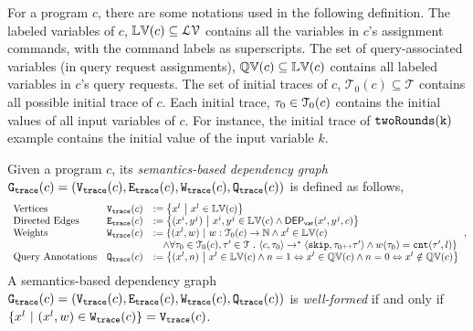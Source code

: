 {
For a program $c$, there are some notations used in the following definition.
The labeled variables of $c$,
$\mathbb{LV}(c) \subseteq \mathcal{LV}$ contains all the variables in $c$'s assignment commands, with the command labels as superscripts. 
The set of query-associated variables (in query request assignments),
$\mathbb{QV}(c) \subseteq \mathbb{LV}(c)$ contains all labeled variables in $c$'s query requests. 
The set of initial traces of $c$,
$\mathcal{T}_0(c) \subseteq \mathcal{T}$
contains all possible initial trace of $c$.
Each initial trace,  $\mathtt{\tau}_0 \in \mathcal{T}_0(c)$ contains the initial values of all input variables of $c$. 
For instance, the initial trace of $\mathtt{twoRounds(k)}$ example contains the initial value of the input variable $k$.
}
\begin{defn}
\label{def:trace_graph}
Given a program ${c}$,
its \emph{semantics-based dependency graph} 
$\mathtt{{G_{trace}}}({c}) = (\mathtt{{V_{trace}}}({c}), \mathtt{{E_{trace}}}({c}), \mathtt{{W_{trace}}}({c}), \mathtt{{Q_{trace}}}({c}))$ is defined as follows,
{\small
\[
\begin{array}{lll}
  \text{Vertices} &
  \traceV({c}) & := \left\{ 
  x^l
  ~ \middle\vert ~ x^l \in \lvar(c)
  \right\}
  \\
  \text{Directed Edges} &
  \traceE({c}) & := 
  \left\{ 
  (x^i, y^j) 
  ~ \middle\vert ~
  x^i, y^j \in \lvar(c) \land \vardep(x^i, y^j, c) 
  \right\}
  \\
  \text{Weights} &
  \traceW({c}) & := 
  \{ 
  (x^l, w) 
  ~ \vert ~ 
  w : \mathcal{T}_0(c) \to \mathbb{N}
  \land
  x^l \in \lvar(c) 
  \\ & &
  \quad \land
  \forall \trace_0 \in \mathcal{T}_0(c), \trace' \in \mathcal{T} \st \config{{c}, \trace_0} \to^{*} 
  \config{\eskip, \trace_0\tracecat\trace'} 
  \land w(\trace_0) = \vcounter(\trace', l) \}  
  \\
  \text{Query Annotations} &
  \traceF({c}) & := 
\left\{(x^l, n)  
~ \middle\vert ~
 x^l \in \lvar(c) \land
n = 1 \Leftrightarrow x^l \in \qvar(c) \land n = 0 \Leftrightarrow  x^l \notin \qvar(c)
\right\}
\end{array},
\]
}
A semantics-based dependency graph $\mathtt{{G_{trace}}}({c})= (\mathtt{{V_{trace}}}({c}), \mathtt{{E_{trace}}}({c}), \mathtt{{W_{trace}}}({c}), \mathtt{{Q_{trace}}}({c}))$ 
is \emph{well-formed} if and only if $ \{x^l \ |\ (x^l,w)\in \mathtt{{W_{trace}}}({c})\} = \mathtt{{V_{trace}}}({c}) $.
\end{defn}


